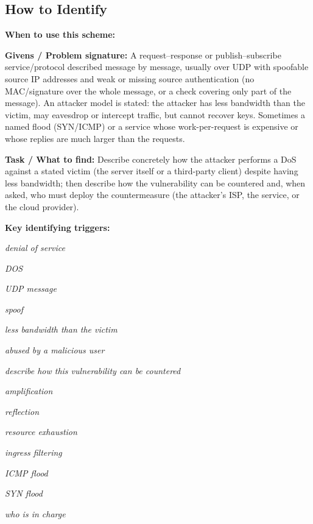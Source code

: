 \documentclass[12pt, a4paper]{article}
\begin{document}
\subsection*{How to Identify}

\textbf{When to use this scheme:}

\textbf{Givens / Problem signature:}
A request--response or publish--subscribe service/protocol described message by message, usually over UDP with spoofable source IP addresses and weak or missing source authentication (no MAC/signature over the whole message, or a check covering only part of the message).
An attacker model is stated: the attacker has less bandwidth than the victim, may eavesdrop or intercept traffic, but cannot recover keys.
Sometimes a named flood (SYN/ICMP) or a service whose work-per-request is expensive or whose replies are much larger than the requests.

\textbf{Task / What to find:}
Describe concretely how the attacker performs a DoS against a stated victim (the server itself or a third-party client) despite having less bandwidth; then describe how the vulnerability can be countered and, when asked, who must deploy the countermeasure (the attacker's ISP, the service, or the cloud provider).

\textbf{Key identifying triggers:}
\begin{tightitem}
        \item \textit{denial of service}
        \item \textit{DOS}
        \item \textit{UDP message}
        \item \textit{spoof}
        \item \textit{less bandwidth than the victim}
        \item \textit{abused by a malicious user}
        \item \textit{describe how this vulnerability can be countered}
        \item \textit{amplification}
        \item \textit{reflection}
        \item \textit{resource exhaustion}
        \item \textit{ingress filtering}
        \item \textit{ICMP flood}
        \item \textit{SYN flood}
        \item \textit{who is in charge}
    \end{tightitem}
\end{document}
